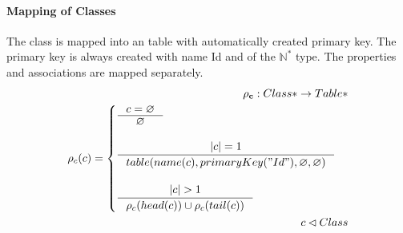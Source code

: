 \documentclass[11pt]{article}
\begin{document}
\paragraph{Mapping of Classes} The class is mapped into an table with  automatically created primary key. The primary key is always created with name Id and of the $\mathbb{N^{*}}$ type. The properties and associations are mapped separately.
\begin{align*}
	\mathbf{\rho_{c}} : Class*  \rightarrow Table* \\
	\rho_{c}(c) = \begin{cases}
		\inference{c = \varnothing}{\varnothing}\\\\
		\inference{|c| = 1}{table(name(c), primaryKey("Id"), \varnothing, \varnothing)}  \\ \\
		\inference{|c| > 1}{\rho_c(head(c)) \cup \rho_c(tail(c))}
 \end{cases}\\
 c \lhd Class
\end{align*}
\end{document}
